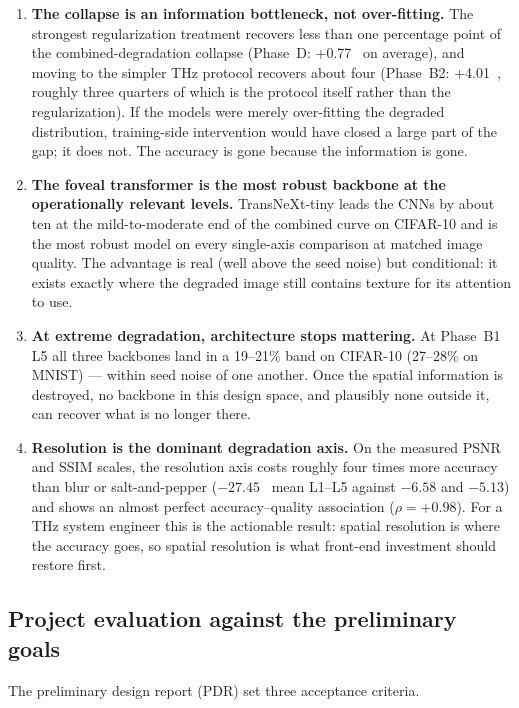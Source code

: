 \begin{enumerate}
  \item \textbf{The collapse is an information bottleneck, not
        over-fitting.} The strongest regularization treatment recovers less
        than one percentage point of the combined-degradation collapse
        (Phase~D: +0.77~\Mpp{} on average), and moving to the simpler THz
        protocol recovers about four (Phase~B2: +4.01~\Mpp{}, roughly three
        quarters of which is the protocol itself rather than the
        regularization). If the models were merely over-fitting the degraded
        distribution, training-side intervention would have closed a large
        part of the gap; it does not. The accuracy is gone because the
        information is gone.
  \item \textbf{The foveal transformer is the most robust backbone at the
        operationally relevant levels.} TransNeXt-tiny leads the CNNs by
        about ten \Mpp{} at the mild-to-moderate end of the combined curve on
        CIFAR-10 and is the most robust model on every single-axis
        comparison at matched image quality. The advantage is real (well
        above the seed noise) but conditional: it exists exactly where the
        degraded image still contains texture for its attention to use.
  \item \textbf{At extreme degradation, architecture stops mattering.} At
        Phase~B1 L5 all three backbones land in a 19--21\% band on CIFAR-10
        (27--28\% on MNIST) --- within seed noise of one another. Once the
        spatial information is destroyed, no backbone in this design space,
        and plausibly none outside it, can recover what is no longer there.
  \item \textbf{Resolution is the dominant degradation axis.} On the
        measured PSNR and SSIM scales, the resolution axis costs roughly
        four times more accuracy than blur or salt-and-pepper
        ($-27.45$~\Mpp{} mean L1--L5 against $-6.58$ and $-5.13$) and shows
        an almost perfect accuracy--quality association
        ($\rho = +0.98$). For a THz system engineer this is the actionable
        result: spatial resolution is where the accuracy goes, so spatial
        resolution is what front-end investment should restore first.
\end{enumerate}

\subsection{Project evaluation against the preliminary goals}
The preliminary design report (PDR) set three acceptance criteria.

